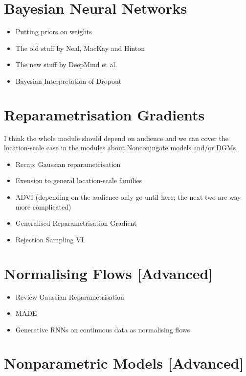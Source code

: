 \documentclass[11pt, a4paper]{article}
\begin{document}
\section{Bayesian Neural Networks}
\begin{itemize}
\item Putting priors on weights
\item The old stuff by Neal, MacKay and Hinton \citep{HintonVancamp:1993}
\item The new stuff by DeepMind et al. \citep{Graves:2011, BlundellEtAl:2015}
\item Bayesian Interpretation of Dropout \citep{Gal:2016}
\end{itemize}

\section{Reparametrisation Gradients}

I think the whole module should depend on audience and we can cover the location-scale case in the modules about Nonconjugate models and/or DGMs.

\begin{itemize}
\item Recap: Gaussian reparametrisation 
\item Exension to general location-scale families \citep{TitsiasLazarogredilla:2014}
\item ADVI (depending on the audience only go until here; the next two are way more complicated) \citep{KucukelbirEtAl:2017}
\item Generalised Reparametrisation Gradient \citep{RuizEtAl:2016}
\item Rejection Sampling VI \citep{NaessethEtAl:2017}
\end{itemize}

\section{Normalising Flows [Advanced]}
\begin{itemize}
\item Review Gaussian Reparametrisation
\item MADE \citep{GermainEtAl:2015}
\item Generative RNNs on continuous data as normalising flows \citep{KingmaEtAl:2016,PapamakariosEtAl:2017}
\end{itemize}

\section{Nonparametric Models [Advanced]}
\end{document}
